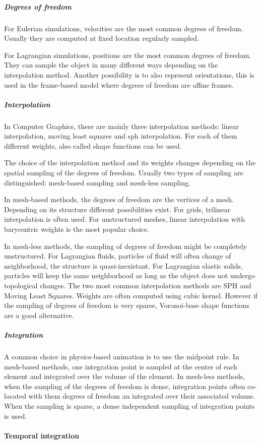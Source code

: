 \subparagraph{Degrees of freedom}
For Eulerian simulations, velocities are the most common degrees of freedom. Usually they are computed at fixed location regularly sampled.

For Lagrangian simulations, positions are the most common degrees of freedom. They can sample the object in many different ways depending on the interpolation method. Another possibility is to also represent orientations, this is used in the frame-based model where degrees of freedom are affine frames.

\subparagraph{Interpolation}
In Computer Graphics, there are mainly three interpolation methods: linear interpolation, moving least squares and sph interpolation. For each of them different weights, also called shape functions can be used. 

The choice of the interpolation method and its weights changes depending on the spatial sampling of the degrees of freedom. Usually two types of sampling are distinguished: mesh-based sampling and mesh-less sampling.

In mesh-based methods, the degrees of freedom are the vertices of a mesh. Depending on its structure different possibilities exist. For grids, trilinear interpolation is often used. For unstructured meshes, linear interpolation with barycentric weights is the most popular choice.

In mesh-less methods, the sampling of degrees of freedom might be completely unstructured. For Lagrangian fluids, particles of fluid will often change of neighborhood, the structure is quasi-inexistant. For Lagrangian elastic solids, particles will keep the same neighborhood as long as the object does not undergo topological changes. The two most common interpolation methods are SPH and Moving Least Squares. Weights are often computed using cubic kernel. However if the sampling of degrees of freedom is very sparse, Voronoi-base shape functions are a good alternative.

\subparagraph{Integration}
A common choice in physics-based animation is to use the midpoint rule.
In mesh-based methods, one integration point is sampled at the center of each element and integrated over the volume of the element.
In mesh-less methods, when the sampling of the degrees of freedom is dense, integration points often co-located with them degrees of freedom an integrated over their associated volume. When the sampling is sparse, a dense independent sampling of integration points is used.

\paragraph{Temporal integration}

